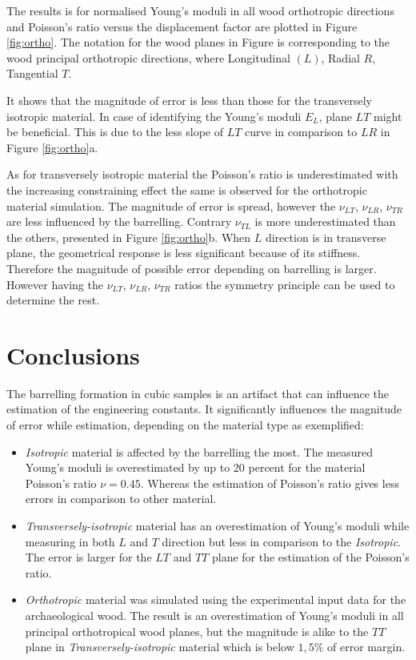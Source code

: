 \documentclass[3p]{elsarticle}
\begin{document}
The results is for normalised Young's moduli in all wood orthotropic directions and Poisson's ratio versus the displacement factor are plotted in Figure \ref{fig:ortho}. The notation for the wood planes in Figure is corresponding to the wood principal orthotropic directions, where Longitudinal $(L)$, Radial $R$, Tangential $T$. \par It shows that the magnitude of error is less than those for the transversely isotropic material. 
In case of identifying the Young's moduli $E_L$, plane  $LT$ might be
beneficial. This is due to the less slope of $LT$ curve in comparison to $LR$ in
Figure \ref{fig:ortho}a. \par
As for transversely isotropic material the Poisson's ratio is underestimated
with the increasing constraining effect the same is observed for the orthotropic
material simulation. The magnitude of error is spread, however the $\nu_{LT}$,
$\nu_{LR}$, $\nu_{TR}$ are less influenced by the barrelling. Contrary
$\nu_{TL}$ is more underestimated than the others, presented in Figure
\ref{fig:ortho}b. When $L$
direction is in transverse plane, the geometrical response is less significant
because of its stiffness. Therefore the magnitude of possible error depending on
barrelling is larger. However having the $\nu_{LT}$,
$\nu_{LR}$, $\nu_{TR}$ ratios the symmetry principle can
be used to determine the rest.











\section{Conclusions}

The barrelling formation in cubic samples is an artifact that can influence the
estimation of the engineering constants. It significantly influences the
magnitude of error while estimation, depending on the material type as
exemplified:

\begin{itemize}
  \item \textit{Isotropic} material is affected by the barrelling the most.
  The measured Young's moduli is overestimated by up to 20 percent for the
  material Poisson's ratio $\nu=0.45$. Whereas the estimation of Poisson's ratio
  gives less errors in comparison to other material.
  \item \textit{Transversely-isotropic} material has an overestimation of Young's moduli while measuring in both $L$ and $T$ direction but less in comparison to the \textit{Isotropic}. The error is larger for the $LT$  and $TT$ plane for the estimation of the Poisson's ratio. 
  \item \textit{Orthotropic} material was simulated using the experimental input data for the archaeological wood. The result is an overestimation of Young's moduli in all principal orthotropical wood planes, but the magnitude is alike to the $TT$ plane in \textit{Transversely-isotropic} material which is below $1,5\%$ of error margin.
\end{itemize}
\end{document}
